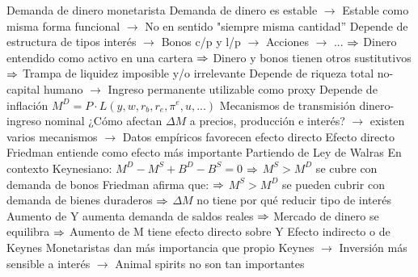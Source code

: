 \documentclass{nuevotema}
\begin{document}
\begin{esquemal}
			\3 Demanda de dinero monetarista
				\4 Demanda de dinero es estable
				\4[] $\to$ Estable como misma forma funcional
				\4[] $\to$ No en sentido "siempre misma cantidad''
				\4 Depende de estructura de tipos interés
				\4[] $\to$ Bonos c/p y l/p
				\4[] $\to$ Acciones
				\4[] $\to$ ...
				\4[] $\then$ Dinero entendido como activo en una cartera
				\4[] $\then$ Dinero y bonos tienen otros sustitutivos
				\4[] $\then$ Trampa de liquidez imposible y/o irrelevante
				\4 Depende de riqueza total no-capital humano
				\4[] $\to$ Ingreso permanente utilizable como proxy
				\4 Depende de inflación
				\4[$\then$] $M^D = P\cdot  L(y, w, r_b, r_e, \pi^e, u, ...)$
			\3 Mecanismos de transmisión dinero-ingreso nominal
				\4 ¿Cómo afectan $\Delta M$ a precios, producción e interés?
				\4[] $\to$ existen varios mecanismos
				\4[] $\to$ Datos empíricos favorecen efecto directo
				\4 Efecto directo
				\4[] Friedman entiende como efecto más importante
				\4[] Partiendo de Ley de Walras
				\4[] En contexto Keynesiano:
				\4[] $M^D -  M^S + B^D - B^S = 0$
				\4[] $\then$ $M^S > M^D$ se cubre con demanda de bonos
				\4[] Friedman afirma que:
				\4[] 
				\4[] $\then$ $M^S > M^D$ se pueden cubrir con demanda de bienes duraderos
				\4[] $\then$ $\Delta M$ no tiene por qué reducir tipo de interés
				\4[] Aumento de Y aumenta demanda de saldos reales
				\4[] $\then$ Mercado de dinero se equilibra
				\4[] $\then$ Aumento de M tiene efecto directo sobre Y
				\4 Efecto indirecto o de Keynes
				\4[] Monetaristas dan más importancia que propio Keynes
				\4[] $\to$ Inversión más sensible a interés
				\4[] $\to$ Animal spirits no son tan importantes

\end{esquemal}
\end{document}
